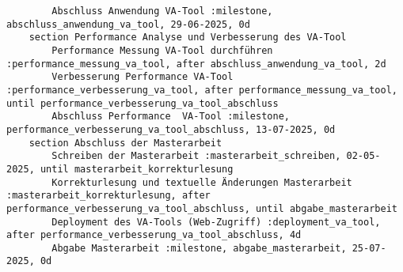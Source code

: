 \begin{lstlisting}
        Abschluss Anwendung VA-Tool :milestone, abschluss_anwendung_va_tool, 29-06-2025, 0d
    section Performance Analyse und Verbesserung des VA-Tool
        Performance Messung VA-Tool durchführen :performance_messung_va_tool, after abschluss_anwendung_va_tool, 2d
        Verbesserung Performance VA-Tool :performance_verbesserung_va_tool, after performance_messung_va_tool, until performance_verbesserung_va_tool_abschluss
        Abschluss Performance  VA-Tool :milestone, performance_verbesserung_va_tool_abschluss, 13-07-2025, 0d
    section Abschluss der Masterarbeit
        Schreiben der Masterarbeit :masterarbeit_schreiben, 02-05-2025, until masterarbeit_korrekturlesung
        Korrekturlesung und textuelle Änderungen Masterarbeit :masterarbeit_korrekturlesung, after performance_verbesserung_va_tool_abschluss, until abgabe_masterarbeit
        Deployment des VA-Tools (Web-Zugriff) :deployment_va_tool, after performance_verbesserung_va_tool_abschluss, 4d
        Abgabe Masterarbeit :milestone, abgabe_masterarbeit, 25-07-2025, 0d
\end{lstlisting}